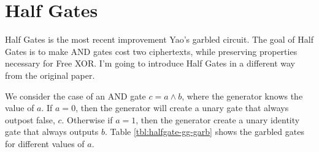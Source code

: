 
\section{Half Gates}
Half Gates is the most recent improvement Yao's garbled circuit.
The goal of Half Gates is to make AND gates cost two ciphertexts, while preserving properties necessary for Free XOR. 
I'm going to introduce Half Gates in a different way from the original paper.

We consider the case of an AND gate $c = a \wedge b$, where the generator knows the value of $a$. 
If $a = 0$, then the generator will create a unary gate that always outpost false, $c$. 
Otherwise if $a = 1$, then the generator create a unary identity gate that always outputs $b$. 
Table \ref{tbl:halfgate-gg-garb} shows the garbled gates for different values of $a$. 

